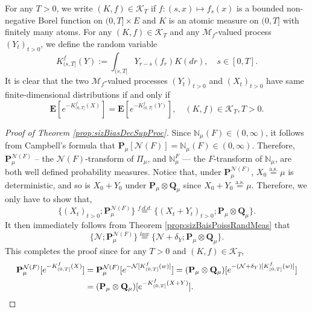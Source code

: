\documentclass[UTF8]{pkuthss}
\theoremstyle{plain}
\theoremstyle{definition}
\numberwithin{equation}{section}
\begin{document}
	For any $T>0$, we write $(K,f)\in \mathcal K_T$ if $f: (s,x) \mapsto f_s(x)$ is a bounded non-negative Borel function on $(0,T] \times E$ and $K$ is an atomic measure on $(0,T]$ with finitely many atoms.
	For any $(K,f)\in\mathcal K_T$ and any $\mathcal M_f$-valued  process $(Y_t)_{t> 0}$, we define the random variable
\[	
	K_{(s, T]}^f(Y)
	:= \int_{(s,T]} Y_{r-s}(f_r) K(dr),
	\quad s\in [0,T].
\]	
	It is clear that the two $\mathcal M_f$-valued processes $(Y_t)_{t>0}$ and $(X_t)_{t>0}$ have same finite-dimensional distributions if and only if
\[
	\mathbf E[e^{-K_{(0,T]}^f(X)}]
	=\mathbf E[e^{-K^f_{(0,T]}(Y)}],
	\quad (K,f)\in \mathcal K_T, T>0.
\]

\begin{proof}[Proof of Theorem \ref{prop:sizBiasDecSupProc}]
	Since $\mathbb N_\mu(F) \in (0,\infty)$, it follows from Campbell's formula that $\mathbf P_\mu[\mathcal N(F)] = \mathbb N_\mu(F) \in (0,\infty)$.
	Therefore, $\mathbf P_\mu^{\mathcal N(F)}$ -- the $\mathcal N(F)$-transform of $\Pi_\mu$, and $\mathbb N_\mu^F$ --- the $F$-transform of $\mathbb N_\mu$, are both well defined probability measures.
	Notice that, under $\mathbf P_\mu^{\mathcal N(F)}$, $X_0\overset{\text{a.s.}}{=}\mu$ is deterministic,
	and so is $X_0+Y_0$ under  $\mathbf P_\mu \otimes \mathbf Q_\mu$ since $X_0+Y_0\overset{\text{a.s.}}=\mu$.
	Therefore, we only have to show that,
\[
	\{(X_t)_{t > 0}; \mathbf P_{\mu}^{\mathcal N(F)}\}
	\overset{f.d.d.}{=} \{(X_t + Y_t)_{t > 0}; \mathbf P_\mu\otimes \mathbf Q_\mu\}.
\]
	It then immediately follows from Theorem \ref{prop:sizBaisPoissRandMeas} that
\[
	\{\mathcal N; \mathbf P^{\mathcal N(F)}_\mu\}
	\overset{law}{=} \{\mathcal N + \delta_Y; \mathbf P_\mu\otimes \mathbf Q_\mu\}.
\]
	This completes the proof since for any $T > 0$ and $(K,f) \in \mathcal K_T$,
\begin{align}
	\mathbf P_\mu^{\mathcal N(F)} [e^{-K_{(0, T]}^f(X)}]
	&= \mathbf P_\mu^{\mathcal N(F)} [e^{-\mathcal N[K_{(0, T]}^f(w)]}]
	= (\mathbf P_\mu\otimes \mathbf Q_\mu) [e^{-(\mathcal N+\delta_Y)[K_{(0, T]}^f(w)]}]\\
	&= (\mathbf P_\mu\otimes \mathbf Q_\mu) [e^{-K_{(0, T]}^f(X+Y)}].
	\qedhere
\end{align}
\end{proof}
\end{document}
